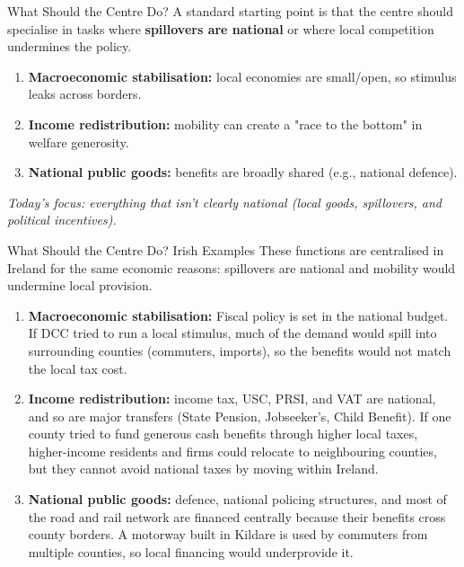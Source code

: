 \documentclass[10pt]{beamer}
\begin{document}
\begin{frame}{What Should the Centre Do?}
A standard starting point is that the centre should specialise in tasks where \textbf{spillovers are national} or where local competition undermines the policy.

\begin{enumerate}
\item \textbf{Macroeconomic stabilisation:} local economies are small/open, so stimulus leaks across borders.
\item \textbf{Income redistribution:} mobility can create a "race to the bottom" in welfare generosity.
\item \textbf{National public goods:} benefits are broadly shared (e.g., national defence).
\end{enumerate}

\vspace{0.15cm}
\footnotesize
\textit{Today’s focus: everything that isn't clearly national (local goods, spillovers, and political incentives).}
\end{frame}


\begin{frame}{What Should the Centre Do? Irish Examples}
\small
These functions are centralised in Ireland for the same economic reasons: spillovers are national and mobility would undermine local provision.

\begin{enumerate}
\item \textbf{Macroeconomic stabilisation:}
Fiscal policy is set in the national budget. If DCC tried to run a local stimulus, much of the demand would spill into surrounding counties (commuters, imports), so the benefits would not match the local tax cost.

\item \textbf{Income redistribution:}
income tax, USC, PRSI, and VAT are national, and so are major transfers (State Pension, Jobseeker’s, Child Benefit).
If one county tried to fund generous cash benefits through higher local taxes, higher-income residents and firms could relocate to neighbouring counties, but they cannot avoid national taxes by moving within Ireland.

\item \textbf{National public goods:}
defence, national policing structures, and most of the road and rail network are financed centrally because their benefits cross county borders.
A motorway built in Kildare is used by commuters from multiple counties, so local financing would underprovide it.
\end{enumerate}
\end{frame}
\end{document}
